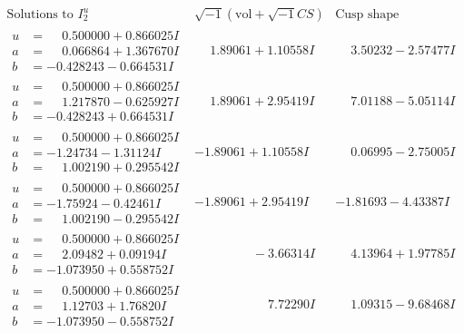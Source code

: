 \documentclass[1p]{elsarticle_modified}
\theoremstyle{definition}
\newcommand{\I}{\sqrt{-1}}
\begin{document}
$$\begin{array}{c|c|c}  
\text{Solutions to }I^u_{2}& \I (\text{vol} + \sqrt{-1}CS) & \text{Cusp shape}\\
 \hline 
\begin{aligned}
u &= \phantom{-}0.500000 + 0.866025 I \\
a &= \phantom{-}0.066864 + 1.367670 I \\
b &= -0.428243 - 0.664531 I\end{aligned}
 & \phantom{-}1.89061 + 1.10558 I & \phantom{-}3.50232 - 2.57477 I \\ \hline\begin{aligned}
u &= \phantom{-}0.500000 + 0.866025 I \\
a &= \phantom{-}1.217870 - 0.625927 I \\
b &= -0.428243 + 0.664531 I\end{aligned}
 & \phantom{-}1.89061 + 2.95419 I & \phantom{-}7.01188 - 5.05114 I \\ \hline\begin{aligned}
u &= \phantom{-}0.500000 + 0.866025 I \\
a &= -1.24734 - 1.31124 I \\
b &= \phantom{-}1.002190 + 0.295542 I\end{aligned}
 & -1.89061 + 1.10558 I & \phantom{-}0.06995 - 2.75005 I \\ \hline\begin{aligned}
u &= \phantom{-}0.500000 + 0.866025 I \\
a &= -1.75924 - 0.42461 I \\
b &= \phantom{-}1.002190 - 0.295542 I\end{aligned}
 & -1.89061 + 2.95419 I & -1.81693 - 4.43387 I \\ \hline\begin{aligned}
u &= \phantom{-}0.500000 + 0.866025 I \\
a &= \phantom{-}2.09482 + 0.09194 I \\
b &= -1.073950 + 0.558752 I\end{aligned}
 & \phantom{-0.000000 } -3.66314 I & \phantom{-}4.13964 + 1.97785 I \\ \hline\begin{aligned}
u &= \phantom{-}0.500000 + 0.866025 I \\
a &= \phantom{-}1.12703 + 1.76820 I \\
b &= -1.073950 - 0.558752 I\end{aligned}
 & \phantom{-0.000000 -}7.72290 I & \phantom{-}1.09315 - 9.68468 I \\ \hline\begin{aligned}

\end{aligned}
\end{array}$$
\end{document}
